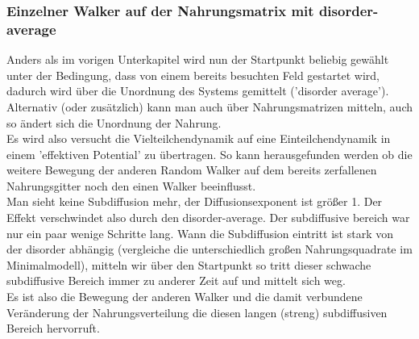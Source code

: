 \documentclass[a4paper, 12pt]{scrartcl}
\begin{document}
\subsubsection{Einzelner Walker auf der Nahrungsmatrix mit disorder-average}
Anders als im vorigen Unterkapitel wird nun der Startpunkt beliebig gewählt unter der Bedingung, dass von einem bereits besuchten Feld gestartet wird, dadurch wird über die Unordnung des Systems gemittelt ('disorder average'). Alternativ (oder zusätzlich) kann man auch über Nahrungsmatrizen mitteln, auch so ändert sich die Unordnung der Nahrung. 
\\
\noindent Es wird also versucht die Vielteilchendynamik auf eine Einteilchendynamik in einem 'effektiven Potential' zu übertragen. So kann herausgefunden werden ob die weitere Bewegung der anderen Random Walker auf dem bereits zerfallenen Nahrungsgitter noch den einen Walker beeinflusst.
\\
\noindent Man sieht keine Subdiffusion mehr, der Diffusionsexponent ist größer 1. Der Effekt verschwindet also durch den disorder-average. Der subdiffusive bereich war nur ein paar wenige Schritte lang. Wann die Subdiffusion eintritt ist stark von der disorder abhängig (vergleiche die unterschiedlich großen Nahrungsquadrate im Minimalmodell), mitteln wir über den Startpunkt so tritt dieser schwache subdiffusive Bereich immer zu anderer Zeit auf und mittelt sich weg.
\\
\noindent Es ist also die Bewegung der anderen Walker und die damit verbundene Veränderung der Nahrungsverteilung die diesen langen (streng) subdiffusiven Bereich hervorruft.
\end{document}
